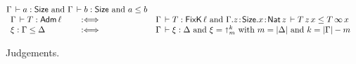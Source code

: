 \begin{figure}[htbp]
\[\begin{array}{l@{\qquad}l@{\qquad}l@{~}l}
     \multicolumn 2 {@{}l@{\quad}} {\Gamma \der a : \Size \mand \Gamma \der b : \Size \mand a \leq b}
\\
  \Gamma \der T : \Adm \ell & \defas &
     \multicolumn 2 {@{}l@{\quad}}
       {\Gamma \der T : \FixK\,\ell \mand \Gamma.z\of\Size.x\of\Nat z \der T\,z\,x \leq T\,\infty\,x}
\\
  \xi : \Gamma \leq \Delta & \defas &
     \multicolumn 2 {@{}l@{\quad}}
       {\Gamma \der \xi : \Delta \mand \xi = \slift^k_m
           \mwith m = |\Delta| \mand k = |\Gamma| - m}
\end{array}
\]
\hrulefill
\vspace{-2ex}
  \caption{Judgements.}
  \label{fig:judge}
\end{figure}

